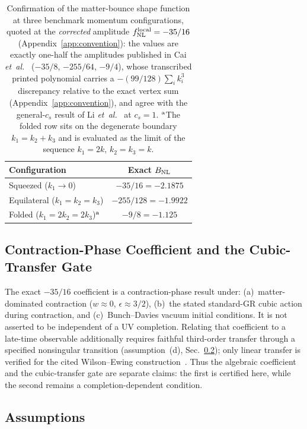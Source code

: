 \documentclass[aps,prd,twocolumn,superscriptaddress,showpacs,preprintnumbers,nofootinbib,longbibliography,floatfix]{revtex4-2}
\newcommand{\fnl}{f_{\rm NL}}
\newcommand{\BNL}{B_{\rm NL}}
\newcommand{\etal}{\textit{et~al.}}
\begin{document}
\begin{table}[h]
\centering
{\small
\begin{tabular}{lc}
\toprule
Configuration & Exact $\BNL$ \\
\midrule
Squeezed ($k_1 \to 0$) & $-35/16=-2.1875$ \\
Equilateral ($k_1 = k_2 = k_3$) & $-255/128=-1.9922$ \\
Folded ($k_1{=}2k_2{=}2k_3$)$^{\rm a}$ & $-9/8=-1.125$ \\
\bottomrule
\end{tabular}
}
\caption{Confirmation of the matter-bounce shape function at three benchmark momentum configurations, quoted at the \emph{corrected} amplitude $\fnl^{\rm local}=-35/16$ (Appendix~\ref{app:convention}): the values are exactly one-half the amplitudes published in Cai \etal~\cite{Cai:2009fn} ($-35/8$, $-255/64$, $-9/4$), whose transcribed printed polynomial carries a $-(99/128)\sum_i k_i^3$ discrepancy relative to the exact vertex sum (Appendix~\ref{app:convention}), and agree with the general-$c_s$ result of Li \etal~\cite{LiQuintin:2017} at $c_s=1$. $^{\rm a}$The folded row sits on the degenerate boundary $k_1 = k_2 + k_3$ and is evaluated as the limit of the sequence $k_1 = 2k$, $k_2 = k_3 = k$.}
\label{tab:benchmarks}
\end{table}

\subsection{Contraction-Phase Coefficient and the Cubic-Transfer Gate}

The exact $-35/16$ coefficient is a contraction-phase result under: (a)~matter-dominated contraction ($w \approx 0$, $\epsilon \approx 3/2$), (b)~the stated standard-GR cubic action during contraction, and (c)~Bunch--Davies vacuum initial conditions. It is not asserted to be independent of a UV completion. Relating that coefficient to a late-time observable additionally requires faithful third-order transfer through a specified nonsingular transition (assumption~(d), Sec.~\ref{sec:assumptions}); only linear transfer is verified for the cited Wilson--Ewing construction~\cite{WilsonEwing:2012}. Thus the algebraic coefficient and the cubic-transfer gate are separate claims: the first is certified here, while the second remains a completion-dependent condition.

\subsection{Assumptions}\label{sec:assumptions}
\end{document}
